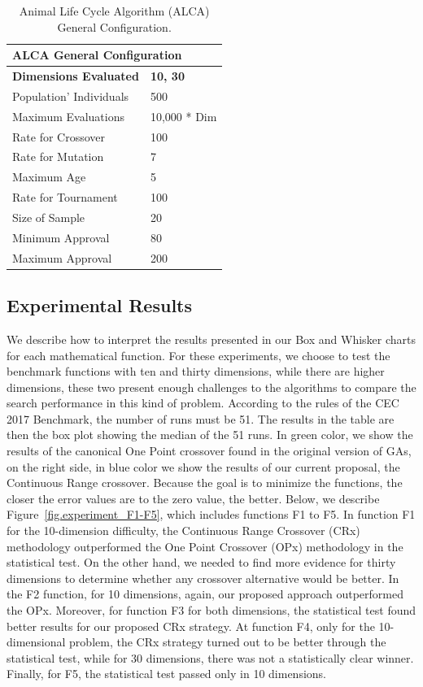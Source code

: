 \documentclass[graybox]{svmult}
\begin{document}
    \begin{table}[]
    \scriptsize
    \centering
    \caption{Animal Life Cycle Algorithm (ALCA) General Configuration.}\label{tab.general_configuration}    
    \begin{tabular}{@{}ll@{}}
    \toprule
    \multicolumn{2}{l}{\textbf{ALCA   General Configuration}} \\ \midrule
    \textbf{Dimensions Evaluated} & \textbf{10, 30} \\
    Population' Individuals & 500 \\
    Maximum Evaluations & 10,000 * Dim \\
    Rate for Crossover & 100 \\
    Rate for Mutation & 7 \\
    Maximum Age & 5 \\
    Rate for Tournament & 100 \\
    Size of Sample & 20 \\
    Minimum Approval & 80 \\
    Maximum Approval & 200 \\ \bottomrule
    \end{tabular}
    \end{table}

    \FloatBarrier


    \subsection{Experimental Results}

    We describe how to interpret the results presented in our Box and Whisker charts for each mathematical function. For these experiments, we choose to test the benchmark functions with ten and thirty dimensions, while there are higher dimensions, these two present enough challenges to the algorithms to compare the search performance in this kind of problem. According to the rules of the CEC 2017 Benchmark, the number of runs must be 51. The results in the table are then the box plot showing the median of the 51 runs. In green color, we show the results of the canonical One Point crossover found in the original version of GAs, on the right side, in blue color we show the results of our current proposal, the Continuous Range crossover. Because the goal is to minimize the functions, the closer the error values are to the zero value, the better. Below, we describe Figure~\ref{fig.experiment_F1-F5}, which includes functions F1 to F5.  In function F1 for the 10-dimension difficulty, the Continuous Range Crossover (CRx) methodology outperformed the One Point Crossover (OPx) methodology in the statistical test. On the other hand, we needed to find more evidence for thirty dimensions to determine whether any crossover alternative would be better. In the F2 function, for 10 dimensions, again, our proposed approach outperformed the OPx. Moreover, for function F3 for both dimensions, the statistical test found better results for our proposed CRx strategy. At function F4, only for the 10-dimensional problem, the CRx strategy turned out to be better through the statistical test, while for 30 dimensions, there was not a statistically clear winner. Finally, for F5, the statistical test passed only in 10 dimensions.
\end{document}

